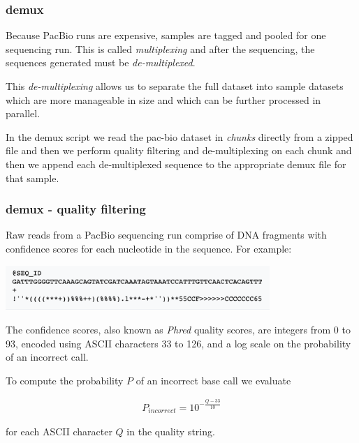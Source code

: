 \documentclass{beamer}
\newcommand{\pdfnarration}[1]{%
\onslide*<\value{beamerpauses}>{\pdfmargincomment[style=note,author=narration]{#1}}%
}
\renewcommand{\pdfnarration}[1]{}
\begin{document}
\begin{frame}[fragile]
\frametitle{ demux }

\alert<1> 

Because PacBio runs are expensive, samples are tagged and pooled for one sequencing run.
This is called {\em multiplexing} and after the sequencing, the sequences generated must be {\em de-multiplexed}.

\bigskip
This {\em de-multiplexing} allows us to separate the full dataset into sample datasets which are more manageable
in size and which can be further processed in parallel.

\bigskip
In the demux script we read the pac-bio dataset in {\em chunks} directly from a zipped file
and then we perform quality filtering and de-multiplexing on each chunk and then we append
each de-multiplexed sequence to the appropriate demux file for that sample.

\end{frame}


\begin{frame}
\frametitle{ demux - quality filtering  }

\alert<1> 

Raw reads from a PacBio sequencing run comprise of DNA fragments with confidence scores
for each nucleotide in the sequence. For example:

\includegraphics[width=10cm]{images/fastq_example.png}

The confidence scores, also known as {\em Phred} quality scores, are integers from 0 to 93, 
encoded using ASCII  characters 33 to 126, and a log scale on the probability of an incorrect call.

\bigskip
To compute the probability $P$ of an incorrect base call we evaluate

\begin{align*}
	P_{incorrect} = 10 ^{- \frac{Q-33}{10} }
\end{align*}

for each ASCII character $Q$ in the quality string. 
\pdfnarration{ 
[[sinc 1000]]
Our starting point is a set of pooled raw reads in fast q format.
[[sinc 1000]]
The confidence scores, also known as {\em Phred} quality scores, 
are integers from 0 to 93,  encoded using ASCII  characters 33 to 126.
[[sinc 1000]]
A log scale is used to encode the probability of an incorrect call.
[[sinc 1000]]
This probability of an incorrect base call, can be computed
using the formula shown.
[[sinc 1000]]
}

\end{frame}
\end{document}
